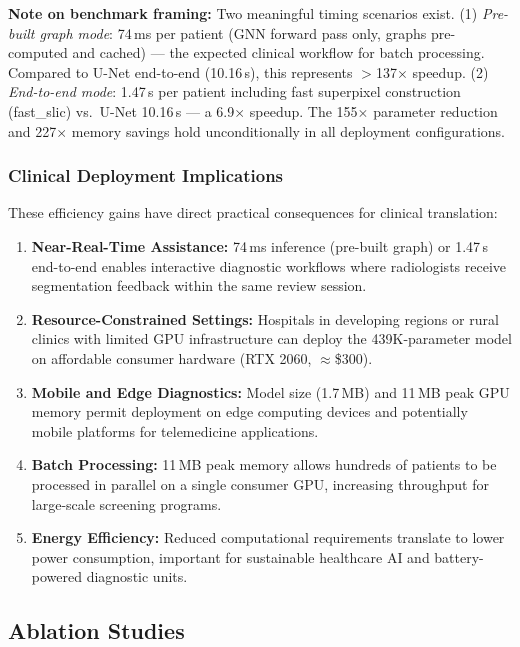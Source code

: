 \textbf{Note on benchmark framing:} Two meaningful timing scenarios exist. (1) \textit{Pre-built graph mode}: 74\,ms per patient (GNN forward pass only, graphs pre-computed and cached) — the expected clinical workflow for batch processing. Compared to U-Net end-to-end (10.16\,s), this represents $>$137$\times$ speedup. (2) \textit{End-to-end mode}: 1.47\,s per patient including fast superpixel construction (fast\_slic) vs.\ U-Net 10.16\,s — a 6.9$\times$ speedup. The 155$\times$ parameter reduction and 227$\times$ memory savings hold unconditionally in all deployment configurations.

\subsubsection{Clinical Deployment Implications}

These efficiency gains have direct practical consequences for clinical translation:

\begin{enumerate}
    \item \textbf{Near-Real-Time Assistance:} 74\,ms inference (pre-built graph) or 1.47\,s end-to-end enables interactive diagnostic workflows where radiologists receive segmentation feedback within the same review session.

    \item \textbf{Resource-Constrained Settings:} Hospitals in developing regions or rural clinics with limited GPU infrastructure can deploy the 439K-parameter model on affordable consumer hardware (RTX 2060, $\approx$\$300).

    \item \textbf{Mobile and Edge Diagnostics:} Model size (1.7\,MB) and 11\,MB peak GPU memory permit deployment on edge computing devices and potentially mobile platforms for telemedicine applications.

    \item \textbf{Batch Processing:} 11\,MB peak memory allows hundreds of patients to be processed in parallel on a single consumer GPU, increasing throughput for large-scale screening programs.

    \item \textbf{Energy Efficiency:} Reduced computational requirements translate to lower power consumption, important for sustainable healthcare AI and battery-powered diagnostic units.
\end{enumerate}


\subsection{Ablation Studies}

